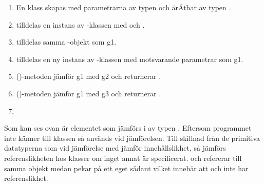\SOLUTION


\TaskSolved \what


\SubtaskSolved  \begin{enumerate}
\item En klass \ifswedish{}\else{}\fi{} skapas med parametrarna \ifswedish{}\else{}\fi{} av typen  och ärÄtbar av typen .
\item {} tilldelas en instans av \ifswedish{}\else{}\fi-klassen med \ifswedish{}\else{}\fi{} och \ifswedish{}\else{}\fi.
\item {} tilldelas samma \ifswedish{}\else{}\fi-objekt som g1.
\item {} tilldelas en ny instans av \ifswedish{}\else{}\fi-klassen med motsvarande parametrar som g1.
\item \code{==}()-metoden jämför g1 med g2 och returnerar .
\item \code{==}()-metoden jämför g1 med g3 och returnerar .
\item {}
\end{enumerate}
Som kan ses ovan är elementet som jämförs i  av typen . Eftersom programmet inte känner till klassen så används  vid jämförelsen. Till skillnad från de primitiva datatyperna som vid jämförelse med  jämför innehållslikhet, så jämförs referenslikheten hos klasser om inget annat är specificerat.  och  refererar till samma objekt medan  pekar på ett eget sådant vilket innebär att  och  inte har referenslikhet.

